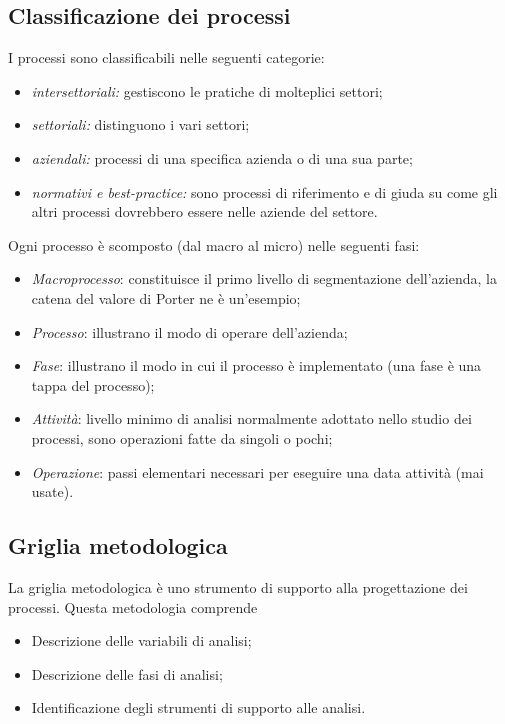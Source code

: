 \documentclass[a4paper, 11pt]{article}
\begin{document}
	\subsection{Classificazione dei processi}
	I processi sono classificabili nelle seguenti categorie: \begin{itemize}
		\item \textit{intersettoriali:} gestiscono le pratiche di molteplici settori;
		\item \textit{settoriali:} distinguono i vari settori;
		\item \textit{aziendali:} processi di una specifica azienda o di una sua parte;
		\item \textit{normativi e best-practice:} sono processi di riferimento e di giuda su come gli altri processi dovrebbero essere nelle aziende del settore.
	\end{itemize}

	Ogni processo è scomposto (dal macro al micro) nelle seguenti fasi: \begin{itemize}
		\item \textit{Macroprocesso}: constituisce il primo livello di segmentazione dell'azienda, la catena del valore di Porter ne è un'esempio;
		\item \textit{Processo}: illustrano il modo di operare dell'azienda;
		\item \textit{Fase}: illustrano il modo in cui il processo è implementato (una fase è una tappa del processo);
		\item \textit{Attività}: livello minimo di analisi normalmente adottato nello studio dei processi, sono operazioni fatte da singoli o pochi;
		\item \textit{Operazione}: passi elementari necessari per eseguire una data attività (mai usate).
	\end{itemize}

	\subsection{Griglia metodologica}
	
	La griglia metodologica è uno strumento di supporto alla progettazione dei processi. Questa metodologia comprende\begin{itemize}
		\item Descrizione delle variabili di analisi;
		\item Descrizione delle fasi di analisi;
		\item Identificazione degli strumenti di supporto alle analisi.
	\end{itemize}
\end{document}
